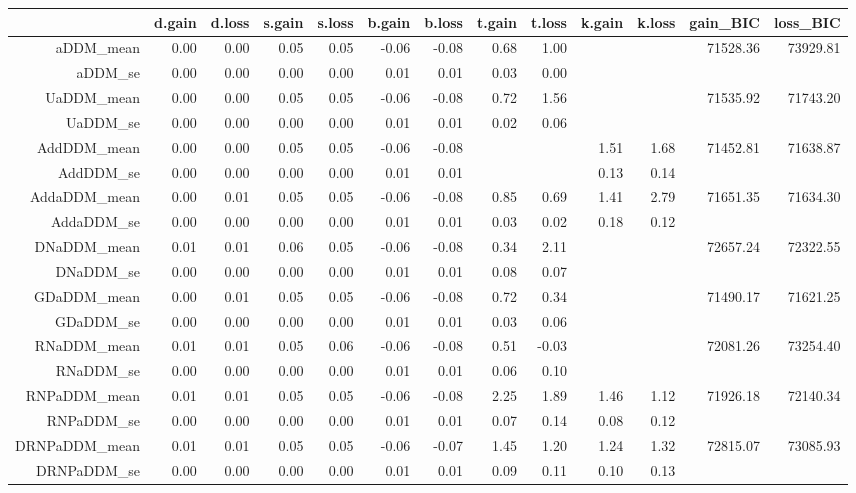 \begin{table}[ht]
\centering
\begin{tabular}{rrrrrrrrrrrrr}
  \hline
 & d.gain & d.loss & s.gain & s.loss & b.gain & b.loss & t.gain & t.loss & k.gain & k.loss & gain\_BIC & loss\_BIC \\ 
  \hline
aDDM\_mean & 0.00 & 0.00 & 0.05 & 0.05 & -0.06 & -0.08 & 0.68 & 1.00 &  &  & 71528.36 & 73929.81 \\ 
  aDDM\_se & 0.00 & 0.00 & 0.00 & 0.00 & 0.01 & 0.01 & 0.03 & 0.00 &  &  &  &  \\ 
  UaDDM\_mean & 0.00 & 0.00 & 0.05 & 0.05 & -0.06 & -0.08 & 0.72 & 1.56 &  &  & 71535.92 & 71743.20 \\ 
  UaDDM\_se & 0.00 & 0.00 & 0.00 & 0.00 & 0.01 & 0.01 & 0.02 & 0.06 &  &  &  &  \\ 
  AddDDM\_mean & 0.00 & 0.00 & 0.05 & 0.05 & -0.06 & -0.08 &  &  & 1.51 & 1.68 & 71452.81 & 71638.87 \\ 
  AddDDM\_se & 0.00 & 0.00 & 0.00 & 0.00 & 0.01 & 0.01 &  &  & 0.13 & 0.14 &  &  \\ 
  AddaDDM\_mean & 0.00 & 0.01 & 0.05 & 0.05 & -0.06 & -0.08 & 0.85 & 0.69 & 1.41 & 2.79 & 71651.35 & 71634.30 \\ 
  AddaDDM\_se & 0.00 & 0.00 & 0.00 & 0.00 & 0.01 & 0.01 & 0.03 & 0.02 & 0.18 & 0.12 &  &  \\ 
  DNaDDM\_mean & 0.01 & 0.01 & 0.06 & 0.05 & -0.06 & -0.08 & 0.34 & 2.11 &  &  & 72657.24 & 72322.55 \\ 
  DNaDDM\_se & 0.00 & 0.00 & 0.00 & 0.00 & 0.01 & 0.01 & 0.08 & 0.07 &  &  &  &  \\ 
  GDaDDM\_mean & 0.00 & 0.01 & 0.05 & 0.05 & -0.06 & -0.08 & 0.72 & 0.34 &  &  & 71490.17 & 71621.25 \\ 
  GDaDDM\_se & 0.00 & 0.00 & 0.00 & 0.00 & 0.01 & 0.01 & 0.03 & 0.06 &  &  &  &  \\ 
  RNaDDM\_mean & 0.01 & 0.01 & 0.05 & 0.06 & -0.06 & -0.08 & 0.51 & -0.03 &  &  & 72081.26 & 73254.40 \\ 
  RNaDDM\_se & 0.00 & 0.00 & 0.00 & 0.00 & 0.01 & 0.01 & 0.06 & 0.10 &  &  &  &  \\ 
  RNPaDDM\_mean & 0.01 & 0.01 & 0.05 & 0.05 & -0.06 & -0.08 & 2.25 & 1.89 & 1.46 & 1.12 & 71926.18 & 72140.34 \\ 
  RNPaDDM\_se & 0.00 & 0.00 & 0.00 & 0.00 & 0.01 & 0.01 & 0.07 & 0.14 & 0.08 & 0.12 &  &  \\ 
  DRNPaDDM\_mean & 0.01 & 0.01 & 0.05 & 0.05 & -0.06 & -0.07 & 1.45 & 1.20 & 1.24 & 1.32 & 72815.07 & 73085.93 \\ 
  DRNPaDDM\_se & 0.00 & 0.00 & 0.00 & 0.00 & 0.01 & 0.01 & 0.09 & 0.11 & 0.10 & 0.13 &  &  \\ 
   \hline
\end{tabular}
\end{table}
